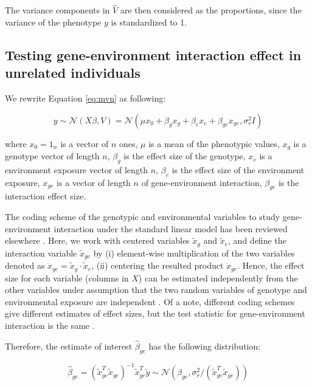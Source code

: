\documentclass[]{book}
\theoremstyle{definition}
\theoremstyle{definition}
\theoremstyle{definition}
\theoremstyle{remark}
\begin{document}
The variance components in \(\hat{V}\) are then considered as the
proportions, since the variance of the phenotype \(y\) is standardized
to 1.

\subsection{Testing gene-environment interaction effect in unrelated
individuals}\label{lmge}

We rewrite Equation \eqref{eq:mvn} as following:

\begin{equation} 
  y \sim \mathcal{N} (X \beta, V) = \mathcal{N} (\mu x_0 + \beta_g x_g + \beta_e x_e + \beta_{ge} x_{ge}, \sigma_r^2 I) 
\label{eq:lmge}
\end{equation}

where \(x_0 = 1_n\) is a vector of \(n\) ones, \(\mu\) is a mean of the
phenotypic values, \(x_g\) is a genotype vector of length \(n\),
\(\beta_g\) is the effect size of the genotype, \(x_e\) is a environment
exposure vector of length \(n\), \(\beta_e\) is the effect size of the
environment exposure, \(x_{ge}\) is a vector of length \(n\) of
gene-environment interaction, \(\beta_{ge}\) is the interaction effect
size.

The coding scheme of the genotypic and environmental variables to study
gene-environment interaction under the standard linear model has been
reviewed elsewhere \citep{Aschard2016}. Here, we work with centered
variables \(\tilde{x}_g\) and \(\tilde{x}_e\), and define the
interaction variable \(\tilde{x}_{ge}\) by (i) element-wise
multiplication of the two variables denoted as
\(\ddot{x}_{ge} = \tilde{x}_g \cdot \tilde{x}_e\), (ii) centering the
resulted product \(\ddot{x}_{ge}\). Hence, the effect size for each
variable (columns in \(X\)) can be estimated independently from the
other variables under assumption that the two random variables of
genotype and environmental exposure are independent \citep[Appendix
C]{Aschard2016}. Of a note, different coding schemes give different
estimates of effect sizes, but the test statistic for gene-environment
interaction is the same \citep[Appendix B]{Aschard2016}.

Therefore, the estimate of interest \(\hat{\beta}_{ge}\) has the
following distribution:

\begin{equation} 
  \hat{\beta}_{ge}  = (\tilde{x}_{ge}^T \tilde{x}_{ge})^{-1} \tilde{x}_{ge}^T \tilde{y} \sim \mathcal{N} (\beta_{ge}, \sigma_r^2 / (\tilde{x}_{ge}^T \tilde{x}_{ge}))
\label{eq:betahatlmge}
\end{equation}
\end{document}
